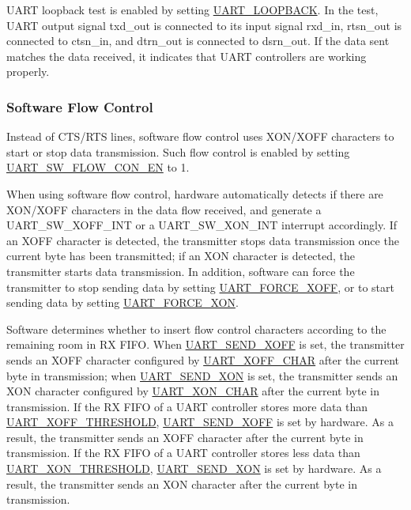 \documentclass[main\_\_EN.tex]{subfiles}
\begin{document}
UART loopback test is enabled by setting \hyperref[fielddesc:UARTLOOPBACK]{UART\_LOOPBACK}. In the test, UART output signal txd\_out is connected to its input signal rxd\_in, rtsn\_out is connected to ctsn\_in, and dtrn\_out is connected to dsrn\_out. If the data sent matches the data received, it indicates that UART controllers are working properly.

\subsubsection{Software Flow Control}

Instead of CTS/RTS lines, software flow control uses XON/XOFF characters to start or stop data transmission. Such flow control is enabled by setting \hyperref[fielddesc:UARTSWFLOWCONEN]{UART\_SW\_FLOW\_CON\_EN} to 1.

When using software flow control, hardware automatically detects if there are XON/XOFF characters in the data flow received, and generate a UART\_SW\_XOFF\_INT or a UART\_SW\_XON\_INT interrupt accordingly. If an XOFF character is detected, the transmitter stops data transmission once the current byte has been transmitted; if an XON character is detected, the transmitter starts data transmission. In addition, software can force the transmitter to stop sending data by setting \hyperref[fielddesc:UARTFORCEXOFF]{UART\_FORCE\_XOFF}, or to start sending data by setting \hyperref[fielddesc:UARTFORCEXON]{UART\_FORCE\_XON}.

Software determines whether to insert flow control characters according to the remaining room in RX FIFO. When \hyperref[fielddesc:UARTSENDXOFF]{UART\_SEND\_XOFF} is set, the transmitter sends an XOFF character configured by \hyperref[fielddesc:UARTXOFFCHAR]{UART\_XOFF\_CHAR} after the current byte in transmission; when \hyperref[fielddesc:UARTSENDXON]{UART\_SEND\_XON} is set, the transmitter sends an XON character configured by \hyperref[fielddesc:UARTXONCHAR]{UART\_XON\_CHAR} after the current byte in transmission. If the RX FIFO of a UART controller stores more data than \hyperref[fielddesc:UARTXOFFTHRESHOLD]{UART\_XOFF\_THRESHOLD}, \hyperref[fielddesc:UARTSENDXOFF]{UART\_SEND\_XOFF} is set by hardware. As a result, the transmitter sends an XOFF character after the current byte in transmission. If the RX FIFO of a UART controller stores less data than \hyperref[fielddesc:UARTXONTHRESHOLD]{UART\_XON\_THRESHOLD}, \hyperref[fielddesc:UARTSENDXON]{UART\_SEND\_XON} is set by hardware. As a result, the transmitter sends an XON character after the current byte in transmission.
\end{document}
